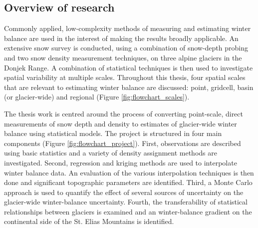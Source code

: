 \documentclass{sfuthesis}
\begin{document}
\subsection{Overview of research}

Commonly applied, low-complexity methods of measuring and estimating winter balance are used in the interest of making the results broadly applicable. An extensive snow survey is conducted, using a combination of snow-depth probing and two snow density measurement techniques, on three alpine glaciers in the Donjek Range. A combination of statistical techniques is then used to investigate spatial variability at multiple scales. Throughout this thesis, four spatial scales that are relevant to estimating winter balance are discussed: point, gridcell, basin (or glacier-wide) and regional (Figure \ref{fig:flowchart_scales}). 

The thesis work is centred around the process of converting point-scale, direct measurements of snow depth and density to estimates of glacier-wide winter balance using statistical models. The project is structured in four main components (Figure \ref{fig:flowchart_project}). First, observations are described using basic statistics and a variety of density assignment methods are investigated. Second, regression and kriging methods are used to interpolate winter balance data. An evaluation of the various interpolation techniques is then done and significant topographic parameters are identified. Third, a Monte Carlo approach is used to quantify the effect of several sources of uncertainty on the glacier-wide winter-balance uncertainty. Fourth, the transferability of statistical relationships between glaciers is examined and an winter-balance gradient on the continental side of the St. Elias Mountains is identified.
\end{document}
